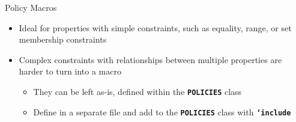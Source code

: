 \documentclass[aspectratio=169]{beamer}
\newcommand{\code}[1]{
  \textbf{\texttt{#1}}
}
\begin{document}
\begin{frame}{Policy Macros}
\begin{itemize}
  \setlength\itemsep{1em}
  \item Ideal for properties with simple constraints, such as equality, range, or set membership constraints
  \item Complex constraints with relationships between multiple properties are harder to turn into a macro
  \vspace{8pt}
  \begin{itemize}
    \setlength\itemsep{1em}
    \item They can be left as-is, defined within the \code{POLICIES} class
    \item Define in a separate file and add to the \code{POLICIES} class with \code{`include}
  \end{itemize}
\end{itemize}
\end{frame}

\begin{frame}
\end{frame}
\end{document}
